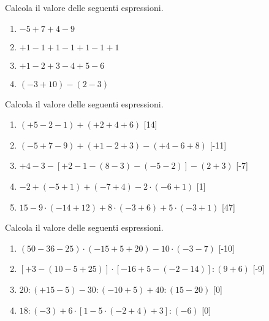 \begin{esercizio}
Calcola il valore delle seguenti espressioni.

\vspace{-.5em}
 \begin{multicols}{2}
 \begin{enumerate}[noitemsep, label=(\alph*)]
 \item \(-5+7+4-9\)
 \item \(+1-1+1-1+1-1+1\)
 \item \(+1-2+3-4+5-6\)
 \item \((-3+10)-(2-3)\)
 \end{enumerate}
 \end{multicols}
\end{esercizio}

\begin{esercizio} %
Calcola il valore delle seguenti espressioni.
 \begin{enumerate}[noitemsep, label=(\alph*)]
 \item \((+5-2-1)+(+2+4+6)\) \hfill[14]
 \item \((-5+7-9)+(+1-2+3)-(+4-6+8)\) \hfill[-11]
 \item \(+4-3-[+2-1-(8-3)-(-5-2)]-(2+3)\) \hfill[-7]
 \item \(-2+(-5+1)+(-7+4)-2 \cdot (-6+1)\) \hfill[1]
 \item \(15-9 \cdot (-14+12)+8 \cdot (-3+6)+ 5 \cdot(-3+1)\) \hfill[47]
 \end{enumerate}
\end{esercizio}

\begin{esercizio} %
Calcola il valore delle seguenti espressioni.
 \begin{enumerate}[noitemsep, label=(\alph*)]
 \item \((50-36-25)\cdot (-15+5+20)-10\cdot (-3-7)\) \hfill[-10]
 \item \([+3-(10-5+25)]\cdot [-16+5-(-2-14)]:(9+6)\) \hfill[-9]
 \item \(20:(+15-5)-30:(-10+5)+40:(15-20)\) \hfill[0]
 \item \(18:(-3)+6\cdot [1-5\cdot (-2+4)+3]: (-6)\) \hfill[0]
\end{enumerate}
\end{esercizio}

